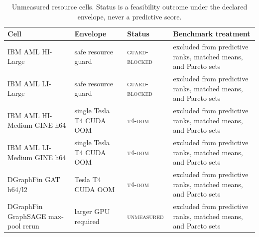 \begin{table}[t]
\caption{Unmeasured resource cells. Status is a feasibility outcome under the declared envelope, never a predictive score.}
\label{tab:resource-boundaries}
\centering
\footnotesize
\setlength{\tabcolsep}{2.2pt}
\begin{tabularx}{\columnwidth}{@{}p{}p{}p{}X@{}}
\toprule
Cell & Envelope & Status & Benchmark treatment \\
\midrule
IBM AML HI-Large & safe resource guard & \textsc{guard-\allowbreak blocked} & excluded from predictive ranks, matched means, and Pareto sets \\
IBM AML LI-Large & safe resource guard & \textsc{guard-\allowbreak blocked} & excluded from predictive ranks, matched means, and Pareto sets \\
IBM AML HI-Medium GINE h64 & single Tesla T4 CUDA OOM & \textsc{t4-oom} & excluded from predictive ranks, matched means, and Pareto sets \\
IBM AML LI-Medium GINE h64 & single Tesla T4 CUDA OOM & \textsc{t4-oom} & excluded from predictive ranks, matched means, and Pareto sets \\
DGraphFin GAT h64/l2 & Tesla T4 CUDA OOM & \textsc{t4-oom} & excluded from predictive ranks, matched means, and Pareto sets \\
DGraphFin GraphSAGE max-pool rerun & larger GPU required & \textsc{unmeasured} & excluded from predictive ranks, matched means, and Pareto sets \\
\bottomrule
\end{tabularx}
\end{table}
